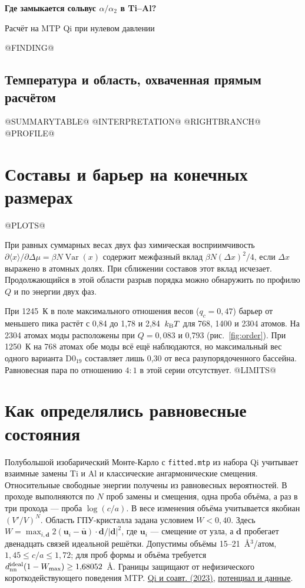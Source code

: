 \documentclass[11pt,a4paper]{article}
\begin{document}
\thispagestyle{plain}
{\sffamily\bfseries\fontsize{23}{26}\selectfont\color{ink}Где замыкается сольвус \(\alpha/\alpha_2\) в Ti--Al?\par}
{\large\sffamily\color{muted}Расчёт на MTP Qi при нулевом давлении\par}
\vspace{1mm}{\color{teal}\rule{\linewidth}{1.1pt}}
@FINDING@

\subsection*{Температура и область, охваченная прямым расчётом}
@SUMMARYTABLE@
@INTERPRETATION@
@RIGHTBRANCH@
@PROFILE@
\clearpage
\section*{Составы и барьер на конечных размерах}
@PLOTS@

При равных суммарных весах двух фаз химическая восприимчивость \(\partial\langle x\rangle/\partial\Delta\mu=\beta N\operatorname{Var}(x)\) содержит межфазный вклад \(\beta N(\Delta x)^2/4\), если \(\Delta x\) выражено в атомных долях. При сближении составов этот вклад исчезает. Продолжающийся в этой области разрыв порядка можно обнаружить по профилю \(Q\) и по энергии двух фаз.

При 1245~К в поле максимального отношения весов (\(q_c=0{,}47\)) барьер от меньшего пика растёт с 0,84 до 1,78 и 2,84~\(k_{\rm B}T\) для 768, 1400 и 2304 атомов. На 2304 атомах моды расположены при \(Q=0{,}083\) и 0,793 (рис.~\ref{fig:order}). При 1250~К на 768 атомах обе моды всё ещё наблюдаются, но максимальный вес одного варианта D0$_{19}$ составляет лишь 0,30 от веса разупорядоченного бассейна. Равновесная пара по отношению \(4:1\) в этой серии отсутствует.
@LIMITS@
\clearpage
\section*{Как определялись равновесные состояния}
Полубольшой изобарический Монте-Карло с \texttt{fitted.mtp} из набора Qi учитывает взаимные замены Ti и Al и классические ангармонические смещения. Относительные свободные энергии получены из равновесных вероятностей. В проходе выполняются по \(N\) проб замены и смещения, одна проба объёма, а раз в три прохода --- проба \(\log(c/a)\). В весе изменения объёма учитывается якобиан \((V'/V)^N\). Область ГПУ-кристалла задана условием \(W<0{,}40\). Здесь \(W=\max_{i,\mathbf d}2(\mathbf u_i-\bar{\mathbf u})\cdot\mathbf d/|\mathbf d|^2\), где \(\mathbf u_i\) --- смещение от узла, а \(\mathbf d\) пробегает двенадцать связей идеальной решётки. Допустимы объёмы 15--21~\AA$^3$/атом, \(1{,}45\le c/a\le1{,}72\); для проб формы и объёма требуется \(d_{\rm nn}^{\rm ideal}(1-W_{\max})\ge1{,}68052\)~\AA. Границы защищают от нефизического короткодействующего поведения MTP. \href{https://doi.org/10.1103/PhysRevMaterials.7.103602}{Qi и соавт. (2023)}, \href{https://doi.org/10.6084/m9.figshare.24079611}{потенциал и данные}.
\end{document}
